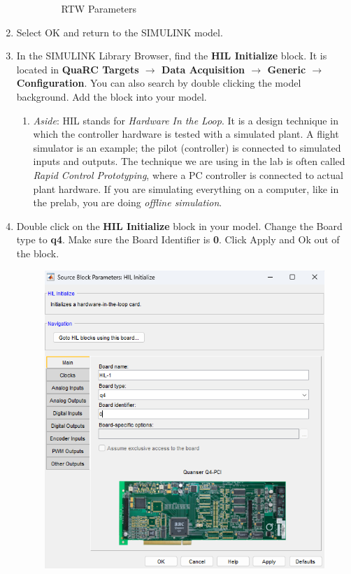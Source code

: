 \documentclass[11pt,letterpaper]{article}
\newcommand{\baro}{\pmb{\rightarrow}}
\begin{document}
\begin{enumerate}
\begin{enumerate}
\begin{figure}[H]
      \caption{RTW Parameters}
      \label{fig:4h_settings}
    \end{figure}
  \end{enumerate}
  \item Select OK and return to the SIMULINK model.
  \item In the SIMULINK Library Browser, find the \textbf{HIL Initialize} block. It is located in \textbf{QuaRC Targets $\baro$ Data Acquisition $\baro$ Generic $\baro$ Configuration}. You can also search by double clicking the model background. Add the block into your model.
  \begin{enumerate}
    \item \textit{Aside}: HIL stands for \textit{Hardware In the Loop}. It is a design technique in which the controller hardware is tested with a simulated plant. A flight simulator is an example; the pilot (controller) is connected to simulated inputs and outputs. The technique we are using in the lab is often called \textit{Rapid Control Prototyping}, where a PC controller is connected to actual plant hardware. If you are simulating everything on a computer, like in the prelab, you are doing \textit{offline simulation}.
  \end{enumerate}
  \item Double click on the \textbf{HIL Initialize} block in your model. Change the Board type to \textbf{q4}. Make sure the Board Identifier is \textbf{0}. Click Apply and Ok out of the block.
  \begin{figure}[H]
    \centering 
    \includegraphics[width=.75\textwidth]{Figures/fig4_HILinit.png}

\end{figure}
\end{enumerate}
\end{document}
